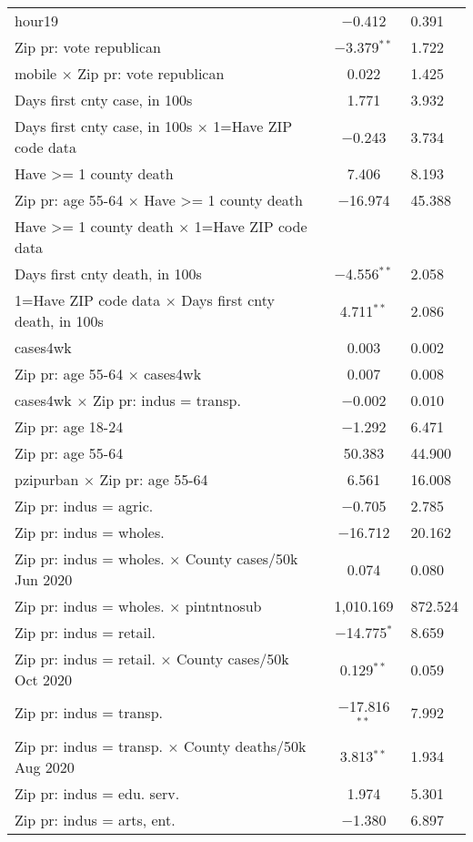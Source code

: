 \begin{table}[!htbp]
\begin{tabular}{@{\extracolsep{5pt}}lc}
  hour19 & $-$0.412 & 0.391 \\ 
  Zip pr: vote republican & $-$3.379$^{**}$ & 1.722 \\ 
  mobile $\times$ Zip pr: vote republican & 0.022 & 1.425 \\ 
  Days first cnty case, in 100s & 1.771 & 3.932 \\ 
  Days first cnty case, in 100s $\times$ 1=Have ZIP code data & $-$0.243 & 3.734 \\ 
  Have >= 1 county death & 7.406 & 8.193 \\ 
  Zip pr: age 55-64 $\times$ Have >= 1 county death & $-$16.974 & 45.388 \\ 
  Have >= 1 county death $\times$ 1=Have ZIP code data &  \\ 
  Days first cnty death, in 100s & $-$4.556$^{**}$ & 2.058 \\ 
  1=Have ZIP code data $\times$ Days first cnty death, in 100s & 4.711$^{**}$ & 2.086 \\ 
  cases4wk & 0.003 & 0.002 \\ 
  Zip pr: age 55-64 $\times$ cases4wk & 0.007 & 0.008 \\ 
  cases4wk $\times$ Zip pr: indus = transp. & $-$0.002 & 0.010 \\ 
  Zip pr: age 18-24 & $-$1.292 & 6.471 \\ 
  Zip pr: age 55-64 & 50.383 & 44.900 \\ 
  pzipurban $\times$ Zip pr: age 55-64 & 6.561 & 16.008 \\ 
  Zip pr: indus = agric. & $-$0.705 & 2.785 \\ 
  Zip pr: indus = wholes. & $-$16.712 & 20.162 \\ 
  Zip pr: indus = wholes. $\times$ County cases/50k Jun 2020 & 0.074 & 0.080 \\ 
  Zip pr: indus = wholes. $\times$ pintntnosub & 1,010.169 & 872.524 \\ 
  Zip pr: indus = retail. & $-$14.775$^{*}$ & 8.659 \\ 
  Zip pr: indus = retail. $\times$ County cases/50k Oct 2020 & 0.129$^{**}$ & 0.059 \\ 
  Zip pr: indus = transp. & $-$17.816$^{**}$ & 7.992 \\ 
  Zip pr: indus = transp. $\times$ County deaths/50k Aug 2020 & 3.813$^{**}$ & 1.934 \\ 
  Zip pr: indus = edu. serv. & 1.974 & 5.301 \\ 
  Zip pr: indus = arts, ent. & $-$1.380 & 6.897 \\ 

\end{tabular}
\end{table}
